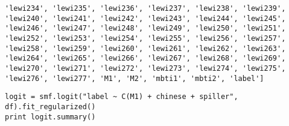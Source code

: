 \documentclass[12pt,fleqn]{article}\usepackage{../common}
\begin{document}
\begin{verbatim}
'lewi234', 'lewi235', 'lewi236', 'lewi237', 'lewi238', 'lewi239', 'lewi240', 'lewi241', 'lewi242', 'lewi243', 'lewi244', 'lewi245', 'lewi246', 'lewi247', 'lewi248', 'lewi249', 'lewi250', 'lewi251', 'lewi252', 'lewi253', 'lewi254', 'lewi255', 'lewi256', 'lewi257', 'lewi258', 'lewi259', 'lewi260', 'lewi261', 'lewi262', 'lewi263', 'lewi264', 'lewi265', 'lewi266', 'lewi267', 'lewi268', 'lewi269', 'lewi270', 'lewi271', 'lewi272', 'lewi273', 'lewi274', 'lewi275', 'lewi276', 'lewi277', 'M1', 'M2', 'mbti1', 'mbti2', 'label']
\end{verbatim}

\begin{verbatim}
logit = smf.logit("label ~ C(M1) + chinese + spiller", df).fit_regularized()
print logit.summary()
\end{verbatim}
\end{document}
